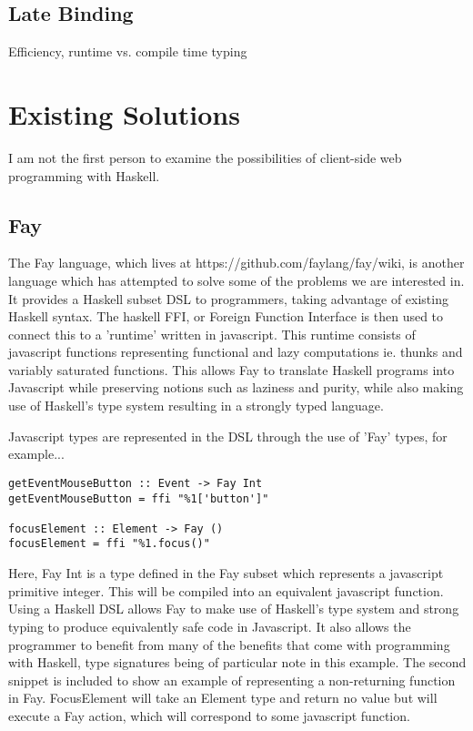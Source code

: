 \documentclass[11pt]{article}
\begin{document}
\subsection{Late Binding}
Efficiency, runtime vs. compile time typing

\pagebreak

\section{Existing Solutions}
I am not the first person to examine the possibilities of client-side web
programming with Haskell.  

\subsection{Fay}
The Fay language, which lives at https://github.com/faylang/fay/wiki, is
another language which has attempted to solve some of the problems we
are interested in. It provides a Haskell subset DSL to programmers, taking
advantage of existing Haskell syntax. The haskell FFI, or Foreign Function
Interface is then used to connect this to a 'runtime' written in javascript.
This runtime consists of javascript functions representing functional and
lazy computations ie. thunks and variably saturated functions. This allows
Fay to translate Haskell programs into Javascript while preserving notions
such as laziness and purity, while also making use of Haskell's type system
resulting in a strongly typed language.

Javascript types are represented in the DSL through the use of 'Fay' types,
for example...
\begin{verbatim}
getEventMouseButton :: Event -> Fay Int
getEventMouseButton = ffi "%1['button']"

focusElement :: Element -> Fay ()
focusElement = ffi "%1.focus()"
\end{verbatim}
Here, Fay Int is a type defined in the Fay subset which represents a javascript
primitive integer. This will be compiled into an equivalent javascript function. 
Using a Haskell DSL allows Fay to make use of Haskell's type system and strong
typing to produce equivalently safe code in Javascript. It also allows the
programmer to benefit from many of the benefits that come with programming with
Haskell, type signatures being of particular note in this example. The second
snippet is included to show an example of representing a non-returning function
in Fay. FocusElement will take an Element type and return no value but will
execute a Fay action, which will correspond to some javascript function.
\end{document}
